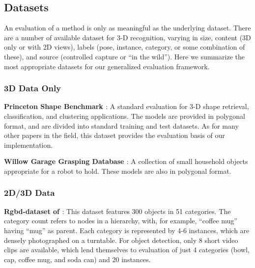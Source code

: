 
\subsection{Datasets}

An evaluation of a method is only as meaningful as the underlying dataset.
There are a number of available dataset for 3-D recognition, varying in size, content (3D only or with 2D views), labels (pose, instance, category, or some combination of these), and source (controlled capture or ``in the wild'').
Here we summarize the most appropriate datasets for our generalized evaluation framework.

\subsubsection{3D Data Only}
{\bf Princeton Shape Benchmark \cite{Shilane2004}}:
A standard evaluation for 3-D shape retrieval, classification, and clustering applications.
The models are provided in polygonal format, and are divided into standard training and test datasets.
As for many other papers in the field, this dataset provides the evaluation basis of our implementation.

{\bf Willow Garage Grasping Database \cite{wgdb}}:
A collection of small household objects appropriate for a robot to hold.
These models are also in polygonal format.

\subsubsection{2D/3D Data}
{\bf Rgbd-dataset of \cite{Lai2011}}:
This dataset features 300 objects in 51 categories.
The category count refers to nodes in a hierarchy, with, for example, ``coffee mug'' having ``mug'' as parent.
Each category is represented by 4-6 instances, which are densely photographed on a turntable.
For object detection, only 8 short video clips are available, which lend themselves to evaluation of just 4 categories (bowl, cap, coffee mug, and soda can) and 20 instances.

